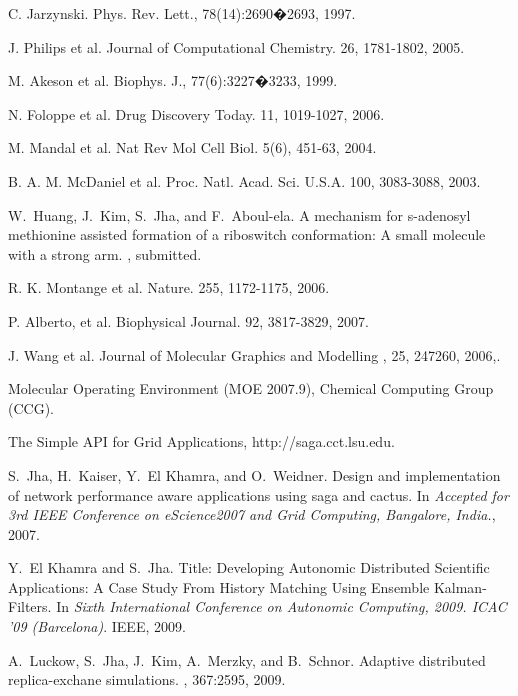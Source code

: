 \begin{thebibliography}{10}

C. Jarzynski. Phys. Rev. Lett., 78(14):2690�2693, 1997.

J. Philips et al. Journal of Computational Chemistry. 26, 1781-1802, 2005.

M. Akeson et al. Biophys. J., 77(6):3227�3233, 1999.

N. Foloppe et al. Drug Discovery Today. 11, 1019-1027, 2006.

M. Mandal et al. Nat Rev Mol Cell Biol. 5(6), 451-63, 2004.

B. A. M. McDaniel et al. Proc. Natl. Acad. Sci. U.S.A. 100, 3083-3088, 2003.

W.~Huang, J.~Kim, S.~Jha, and F.~Aboul-ela.
\newblock A mechanism for s-adenosyl methionine assisted formation of a
  riboswitch conformation: A small molecule with a strong arm.
, submitted.

R. K. Montange et al. Nature. 255, 1172-1175, 2006.

P. Alberto, et al. Biophysical Journal. 92, 3817-3829, 2007.

J. Wang et al. Journal of Molecular Graphics and Modelling , 25, 247260, 2006,.

Molecular Operating Environment (MOE 2007.9), Chemical Computing Group (CCG).

The Simple API for Grid Applications, http://saga.cct.lsu.edu.

S.~Jha, H.~Kaiser, Y.~El Khamra, and O.~Weidner.
\newblock Design and implementation of network performance aware applications
  using saga and cactus.
\newblock In {\em Accepted for 3rd IEEE Conference on eScience2007 and Grid
  Computing, Bangalore, India.}, 2007.

Y.~El Khamra and S.~Jha.
\newblock Title: {Developing Autonomic Distributed Scientific Applications: A
  Case Study From History Matching Using Ensemble Kalman-Filters}.
\newblock In {\em Sixth International Conference on Autonomic Computing, 2009.
  ICAC '09 (Barcelona)}. IEEE, 2009.

A.~Luckow, S.~Jha, J.~Kim, A.~Merzky, and B.~Schnor.
\newblock Adaptive distributed replica-exchane simulations.
, 367:2595, 2009.


\end{thebibliography}
